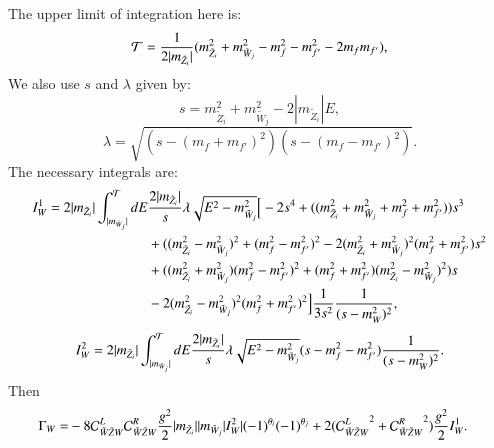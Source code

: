\documentclass[final,3p,times]{elsarticle}
\begin{document}
The upper limit of integration here is:
\begin{equation}
\mathcal{T} = {1 \over 2|m_{\tilde{Z}_{i}}|} (m_{\tilde{Z}_i}^2 + m_{\tilde{W}_j}^2 - m_{f}^2 - m_{f'}^2 - 2m_{f}m_{f'}),
\end{equation}
We also use $s$ and $\lambda$ given by:
\begin{equation}
s = m_{\tilde{Z}_{i}}^2 + m_{\tilde{W}_j}^2 - 2|m_{\tilde{Z}_i}|E,
\end{equation}
\begin{equation}
\lambda = \sqrt{(s - (m_{f} + m_{f'})^2)(s - (m_{f} - m_{f'})^2)}.
\end{equation}
The necessary integrals are:	
\begin{equation}
\begin{aligned}
I_{W}^{1} = 2|m_{\tilde{Z}_i}| \int_{|m_{\tilde{W}_{j}}|}^{\mathcal{T}} dE & {2|m_{\tilde{Z}_i}| \over s} \lambda \sqrt{E^2 - m_{\tilde{W}_j}^2} \Big[-2s^4 + ((m_{\tilde{Z}_i}^2 + m_{\tilde{W}_j}^2 + m_{f}^2 + m_{f'}^2))s^3 \\ & + ((m_{\tilde{Z}_i}^2 - m_{\tilde{W}_j}^2)^2 + (m_{f}^2 - m_{f'}^2)^2 - 2(m_{\tilde{Z}_i}^2 + m_{\tilde{W}_j}^2)^2 (m_{f}^2 + m_{f'}^2)s^2 \\ & + ((m_{\tilde{Z}_i}^2 + m_{\tilde{W}_j}^2)(m_{f}^2 - m_{f'}^2)^2 + (m_{f}^2 + m_{f'}^2)(m_{\tilde{Z}_i}^2 - m_{\tilde{W}_j}^2)^2)s \\ & - 2(m_{\tilde{Z_{i}}}^2 - m_{\tilde{W}_j}^2)^2 (m_{f}^2 + m_{f'}^2)^2\Big]{1 \over 3s^2}{1 \over (s-m_{W}^2)^2},
\end{aligned}
\end{equation}
\begin{equation}
\begin{aligned}
I_{W}^{2} = 2|m_{\tilde{Z}_i}| \int_{|m_{\tilde{W}_{j}}|}^{\mathcal{T}} dE {2|m_{\tilde{Z}_i}| \over s} \lambda \sqrt{E^2 - m_{\tilde{W}_j}^2} (s - m_{f}^2 - m_{f'}^2){1 \over (s-m_{W}^2)^2}.
\end{aligned}
\end{equation}
Then
\begin{equation}
\begin{aligned}
\Gamma_W = & -8 \mathcal{C}_{\tilde{W} \tilde{Z} W}^L  \mathcal{C}_{\tilde{W} \tilde{Z} W}^R  {g^2 \over 2} |m_{\tilde{Z}_i}||m_{\tilde{W}_j}|I_{W}^2|(-1)^{\theta_i}(-1)^{\theta_j} + 2({\mathcal{C}_{\tilde{W} \tilde{Z} W}^L}^2 + {\mathcal{C}_{\tilde{W} \tilde{Z} W}^R}^2){g^2 \over 2} I_{W}^1.
\end{aligned}
\end{equation}
\end{document}
